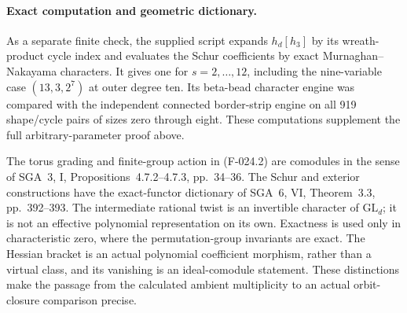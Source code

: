 \paragraph{Exact computation and geometric dictionary.}
As a separate finite check, the supplied script
expands \(h_d[h_3]\) by its wreath-product cycle index
and evaluates the Schur coefficients by exact
Murnaghan--Nakayama characters. It gives one for
\(s=2,\ldots,12\), including the nine-variable case
\((13,3,2^7)\) at outer degree ten. Its beta-bead
character engine was compared with the independent connected
border-strip engine on all 919 shape/cycle pairs of sizes
zero through eight. These computations supplement the full
arbitrary-parameter proof above.

The torus grading and finite-group action in (F-024.2)
are comodules in the sense of SGA~3, I,
Propositions~4.7.2--4.7.3, pp.~34--36. The Schur and
exterior constructions have the exact-functor dictionary
of SGA~6, VI, Theorem~3.3, pp.~392--393.
The intermediate rational twist is an invertible character
of \(\mathrm{GL}_d\); it is not an effective polynomial
representation on its own. Exactness is used only in
characteristic zero, where the permutation-group invariants
are exact. The Hessian bracket is an actual polynomial
coefficient morphism, rather than a virtual class, and its
vanishing is an ideal-comodule statement. These distinctions
make the passage from the calculated ambient multiplicity
to an actual orbit-closure comparison precise.

